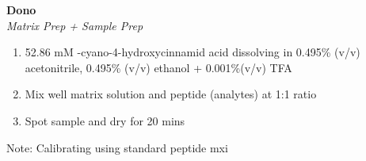 \textbf{Dono} 
\\
\textit{Matrix Prep + Sample Prep}
\begin{enumerate}
\item{52.86 mM \alpha-cyano-4-hydroxycinnamid acid dissolving in 0.495\% (v/v) acetonitrile, 0.495\% (v/v) ethanol + 0.001\%(v/v) TFA}
\item{Mix well matrix solution and peptide (analytes) at 1:1 ratio}
\item{Spot sample and dry for 20 mins}
\end{enumerate}
\footnotesize
Note: Calibrating using standard peptide mxi